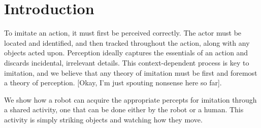 

\section{Introduction}

To imitate an action, it must first be perceived correctly.  
%
The actor must be located and identified, and then tracked throughout
the action, along with any objects acted upon.
%
Perception ideally captures the essentials of an
action and discards incidental, irrelevant details.  
This context-dependent process is key to imitation, and
we believe that any theory of imitation must be first and foremost
a theory of perception.
%
[Okay, I'm just spouting nonsense here so far].

We show how a robot can acquire the appropriate percepts for imitation
through a shared activity, one that can be done either by the robot or
a human.  This activity is simply striking objects and watching how
they move.
